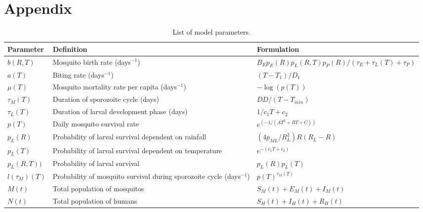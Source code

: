 \documentclass[a4paper,fleqn]{cas-dc}
\begin{document}
\appendix
\renewcommand{\thetable}{A.\arabic{table}}
\setcounter{table}{0}  %

\section{Appendix}

\begin{table}[width=2.0\linewidth,cols=3,pos=h]
\caption{List of model parameters.}\label{tbl1}
\renewcommand{\thetable}{Appendix 1}  %
\begin{tabular*}{\tblwidth}{@{} LLL@{} }
\toprule
Parameter & Definition & Formulation\\
\midrule
$b(R, T)$   & Mosquito birth rate (days$^{-1}$)   & ${B_E  p_E(R)  p_L(R,T)  p_P(R)}/{(\tau_E + \tau_L(T) + \tau_P)}$   \\ 
$a(T)$   & Biting rate (days$^{-1}$)  & ${(T - T_1)}/{D_1}$   \\ 
$\mu(T)$   & Mosquito mortality rate per capita (days$^{-1}$)   & $-\log(p(T))$  \\ 
$\tau_M(T)$   & Duration of sporozoite cycle (days)   & ${DD}/{(T - T_{min})}$   \\ 
$\tau_L(T)$   & Duration of larval development phase (days)   & ${1}/{c_1T + c_2}$  \\ 
$p(T)$   & Daily mosquito survival rate   & $e^{(-1 / (AT^2 + BT + C))}$ \\  
$p_L(R)$   & Probability of larval survival dependent on rainfall   & $({4p_{ML}}/{R_L^2})R(R_L - R)$  \\  
$p_L(T)$   & Probability of larval survival dependent on temperature   & $e^{-(c_1T + c_2)}$  \\ 
$p_L(R, T))$   &Probability of larval survival   & $p_L(R)p_L(T)$   \\  
$l({\tau_M})(T)$   &  Probability of mosquito survival during sporozoite cycle (days$^{-1}$)  & $p(T)^{\tau_M(T)}$  \\ 
$M(t)$   &  Total population of mosquitos  & $S_M(t) + E_M(t) + I_M(t)$   \\ 
$N(t)$   & Total population of humans   & $S_H(t) + I_H(t) + R_H(t)$   \\ 
\bottomrule
\end{tabular*}
\end{table}

\clearpage
\end{document}
